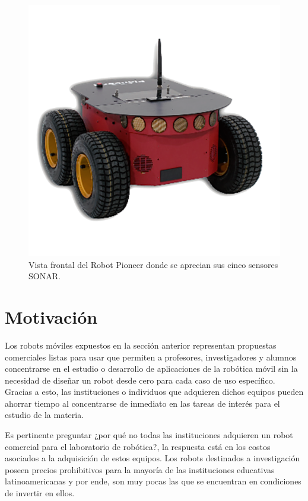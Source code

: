 \begin{figure}[ht]
	\centering
	\includegraphics[scale=1.1]{./Figures/pioneer.png}
	\caption{Vista frontal del Robot Pioneer donde se aprecian sus cinco sensores SONAR\protect\footnotemark.}
	\label{fig:robotPioneer}
\end{figure}


\section{Motivación}

Los robots móviles expuestos en la sección anterior representan propuestas comerciales listas para usar que permiten a profesores, investigadores y alumnos concentrarse en el estudio o desarrollo de aplicaciones de la robótica móvil sin la necesidad de diseñar un robot desde cero para cada caso de uso específico. Gracias a esto, las instituciones o individuos que adquieren dichos equipos pueden ahorrar tiempo al concentrarse de inmediato en las tareas de interés para el estudio de la materia.

Es pertinente preguntar ¿por qué no todas las instituciones adquieren un robot comercial para el laboratorio de robótica?, la respuesta está en los costos asociados a la adquisición de estos equipos. Los robots destinados a investigación poseen precios prohibitivos para la mayoría de las instituciones educativas latinoamericanas y por ende, son muy pocas las que se encuentran en condiciones de invertir en ellos.


